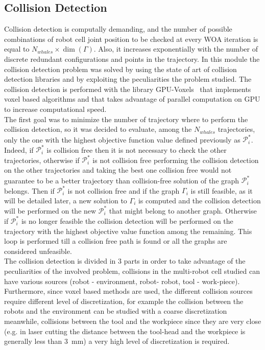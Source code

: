 \documentclass[twocolumn]{svjour3}
\begin{document}
\subsection{Collision Detection}
\label{coll}
Collision detection is computally demanding, and the number of possible combinations of robot cell joint position to be checked at every WOA iteration is equal to $N_{whales}\times \dim(\Gamma)$. Also, it increases exponentially with the number of discrete redundant configurations and points in the trajectory. In this module the collision detection problem was solved by using the state of art of collision detection libraries and by exploiting the peculiarities the problem studied. The collision detection is performed with the library GPU-Voxels~\cite{Hermann2014} that implements voxel based algorithms and that takes advantage of parallel computation on GPU to increase computational speed.\\
The first goal was to minimize the number of trajectory where to perform the collision detection, so it was decided to evaluate, among the $N_{whales}$ trajectories, only the one with the highest objective function  value defined previously as $\mathcal{P}^*_i$. Indeed, if $\mathcal{P}^*_i$ is collision free then it is not necessary to check the other trajectories, otherwise if $\mathcal{P}^*_i$ is not collision free performing the collision detection on the other trajectories and taking the best one collision free would not guarantee to be a better trajectory than collision-free solution of the graph $\mathcal{P}^*_i$ belongs. Then if $\mathcal{P}^*_i$ is not collision free and if the graph $\Gamma_i$ is still feasible, as it will be detailed later, a new solution to $\Gamma_i$ is computed and the collision detection will be performed on the new $\mathcal{P}^*_i$ that might belong to another graph. Otherwise if $\mathcal{P}^*_i$ is no longer feasible the collision detection will be performed on the trajectory with the highest objective value function among the remaining. This loop is performed till a collision free path is found or all the graphs are considered unfeasible.\\
The collision detection is divided in 3 parts in order to take advantage of the peculiarities of the involved problem,  collisions in the multi-robot cell studied can have various sources (robot - environment, robot- robot, tool - work-piece). Furthermore, since voxel based methods are used, the different collision sources require different level of discretization, for example the collision between the robots and the environment can be studied with a coarse discretization meanwhile, collisions between the tool and the workpiece since they are very close (e.g. in laser cutting the distance between the tool-head and the workpiece is generally less than 3~mm) a very high level of discretization is required. 
\end{document}
